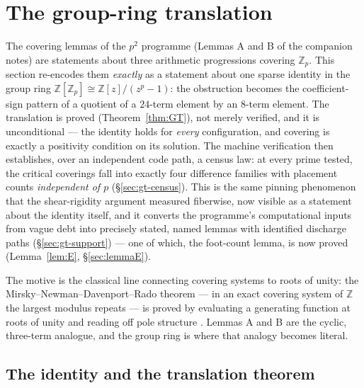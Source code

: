 \documentclass[11pt,a4paper]{article}
\numberwithin{equation}{section}
\theoremstyle{plain}
\theoremstyle{definition}
\theoremstyle{remark}
\newcommand{\Z}{\mathbb{Z}}
\begin{document}

\section{The group-ring translation}\label{sec:groupring}

The covering lemmas of the $p^2$ programme (Lemmas A and B of the companion
notes) are statements about three arithmetic progressions covering $\Z_p$.
This section re-encodes them \emph{exactly} as a statement about one sparse
identity in the group ring $\Z[\Z_p]\cong\Z[z]/(z^p-1)$: the obstruction
becomes the coefficient-sign pattern of a quotient of a $24$-term element by
an $8$-term element. The translation is proved (Theorem~\ref{thm:GT}), not
merely verified, and it is unconditional --- the identity holds for
\emph{every} configuration, and covering is exactly a positivity condition on
its solution. The machine verification then establishes, over an independent
code path, a census law: at every prime tested, the critical coverings fall
into exactly four difference families with placement counts \emph{independent
of $p$} (\S\ref{sec:gt-census}). This is the same pinning phenomenon that the
shear-rigidity argument measured fiberwise, now visible as a statement about
the identity itself, and it converts the programme's computational inputs
from vague debt into precisely stated, named lemmas with identified
discharge paths (\S\ref{sec:gt-support}) --- one of which, the foot-count
lemma, is now proved (Lemma~\ref{lem:E}, \S\ref{sec:lemmaE}).

The motive is the classical line connecting covering systems to roots of
unity: the Mirsky--Newman--Davenport--Rado theorem --- in an exact covering
system of $\Z$ the largest modulus repeats --- is proved by evaluating a
generating function at roots of unity and reading off pole structure
\cite{MirskyNewman}. Lemmas A and B are the cyclic, three-term analogue, and
the group ring is where that analogy becomes literal.

\subsection{The identity and the translation theorem}\label{sec:gt-identity}
\end{document}
